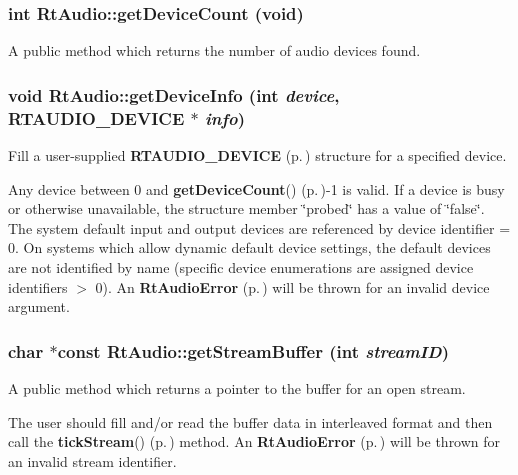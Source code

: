 \subsubsection{\setlength{\rightskip}{0pt plus 5cm}int Rt\-Audio::get\-Device\-Count (void)}\label{classRtAudio_a6}


A public method which returns the number of audio devices found.

\subsubsection{\setlength{\rightskip}{0pt plus 5cm}void Rt\-Audio::get\-Device\-Info (int {\em device}, {\bf RTAUDIO\_\-DEVICE} $\ast$ {\em info})}\label{classRtAudio_a7}


Fill a user-supplied {\bf RTAUDIO\_\-DEVICE} {\rm (p.\,\pageref{structRtAudio_1_1RTAUDIO__DEVICE})} structure for a specified device.

Any device between 0 and {\bf get\-Device\-Count}() {\rm (p.\,\pageref{classRtAudio_a6})}-1 is valid. If a device is busy or otherwise unavailable, the structure member \char`\"{}probed\char`\"{} has a value of \char`\"{}false\char`\"{}. The system default input and output devices are referenced by device identifier = 0. On systems which allow dynamic default device settings, the default devices are not identified by name (specific device enumerations are assigned device identifiers $>$ 0). An {\bf Rt\-Audio\-Error} {\rm (p.\,\pageref{classRtAudioError})} will be thrown for an invalid device argument. 
\subsubsection{\setlength{\rightskip}{0pt plus 5cm}char $\ast$const Rt\-Audio::get\-Stream\-Buffer (int {\em stream\-ID})}\label{classRtAudio_a8}


A public method which returns a pointer to the buffer for an open stream.

The user should fill and/or read the buffer data in interleaved format and then call the {\bf tick\-Stream}() {\rm (p.\,\pageref{classRtAudio_a9})} method. An {\bf Rt\-Audio\-Error} {\rm (p.\,\pageref{classRtAudioError})} will be thrown for an invalid stream identifier. 
